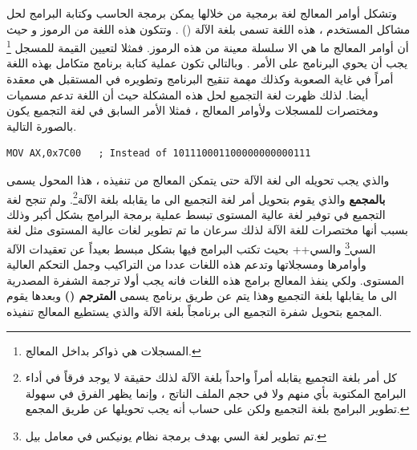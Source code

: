 \documentclass[document.tex]{subfiles}
\begin{document}
وتشكل أوامر المعالج لغة برمجية من خلالها يمكن برمجة الحاسب وكتابة البرامج لحل مشاكل المستخدم ، هذه اللغة تسمى بلغة الآلة () . وتتكون هذه اللغة من الرموز  و  حيث أن أوامر المعالج ما هي الا سلسلة معينة من هذه الرموز. فمثلا لتعيين القيمة  للمسجل \footnote{المسجلات هي ذواكر بداخل المعالج.} يجب أن يحوي البرنامج على الأمر . وبالتالي تكون عملية كتابة برنامج متكامل بهذه اللغة أمراً في غاية الصعوبة وكذلك مهمة تنقيح البرنامج وتطويره في المستقبل هي معقدة أيضا. لذلك ظهرت لغة التجميع لحل هذه المشكلة حيث أن اللغة تدعم مسميات ومختصرات للمسجلات ولأوامر المعالج ، فمثلا الأمر السابق في لغة التجميع يكون بالصورة التالية. 
\begin{english}

\lstset{numberstyle=\tiny,numbers=left,stepnumber=1,numbersep=5pt,tabsize=2,extendedchars=true,breaklines=true,frame=b,showspaces=false, showtabs=false,xleftmargin=10pt,framexleftmargin=10pt,framexrightmargin=5pt,framexbottommargin=4pt,showstringspaces=false,language=[x86masm]Assembler}


\begin{lstlisting}[label=lst:mov,caption=\en{Assembly Language}]
	MOV AX,0x7C00	; Instead of 101110001100000000000111
\end{lstlisting}
\end{english}

والذي يجب تحويله الى لغة الآلة حتى يتمكن المعالج من تنفيذه ، هذا المحول يسمى \textbf{بالمجمع} والذي يقوم بتحويل أمر لغة التجميع الى ما يقابله بلغة الآلة\footnote{كل أمر بلغة التجميع يقابله أمراً واحداً بلغة الآلة لذلك حقيقة لا يوجد فرقاً في أداء البرامج المكتوبة بأي منهم ولا في حجم الملف الناتج ، وإنما يظهر الفرق في سهولة تطوير البرامج بلغة التجميع ولكن على حساب أنه يجب تحويلها عن طريق المجمع.}. ولم تنجح لغة التجميع في توفير لغة عالية المستوى تبسط عملية برمجة البرامج بشكل أكبر وذلك بسبب أنها مختصرات للغة الآلة لذلك سرعان ما تم تطوير لغات عالية المستوى مثل لغة السي\footnote{تم تطوير لغة السي بهدف برمجة نظام يونيكس  في معامل بيل.} والسي++ بحيث تكتب البرامج فيها بشكل مبسط بعيداً عن تعقيدات الآلة وأوامرها ومسجلاتها وتدعم هذه اللغات عددا من التراكيب وجمل التحكم العالية المستوى. ولكي ينفذ المعالج برامج هذه اللغات فانه يجب أولا ترجمة الشفرة المصدرية الى ما يقابلها بلغة التجميع وهذا يتم عن طريق برنامج يسمى \textbf{المترجم ()} وبعدها يقوم المجمع بتحويل شفرة التجميع الى برنامجاً بلغة الآلة والذي يستطيع المعالج تنفيذه.   
\end{document}
